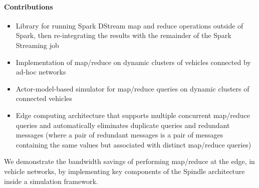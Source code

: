 \documentclass{thesis}
\begin{document}
    \paragraph{Contributions}
        \begin{itemize}
            \item Library for running Spark DStream map and reduce operations outside of Spark, then
                re-integrating the results with the remainder of the Spark Streaming job
            \item Implementation of map/reduce on dynamic clusters of vehicles connected by ad-hoc networks
            \item Actor-model-based simulator for map/reduce queries on dynamic clusters of connected vehicles
            \item Edge computing architecture that supports multiple concurrent map/reduce queries
                and automatically eliminates duplicate queries and redundant messages (where a pair of
                redundant messages is a pair of messages containing the same values but associated with
                distinct map/reduce queries)
        \end{itemize}

    We demonstrate the bandwidth savings of performing map/reduce at the edge, in
    vehicle networks, by implementing key components of the Spindle architecture inside a simulation framework.
\end{document}

